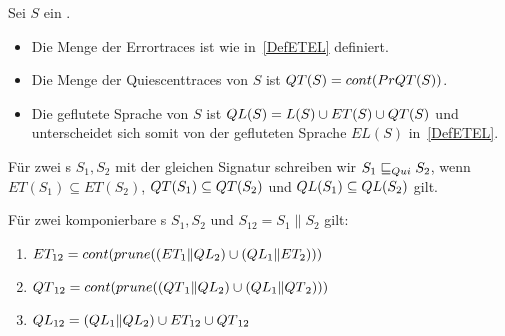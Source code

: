 \begin{Def}
  \label{DefQTQL}
  Sei $S$ ein \EIO{}.
  \begin{itemize}
    \item Die Menge der Errortraces ist wie in~\ref{DefETEL} definiert.
    \item Die Menge der Quiescenttraces von $S$ ist $QT{}(S) = cont(PrQT{}(S))$.
    \item Die geflutete Sprache von $S$ ist $QL{}(S)=L(S)\cup ET(S)\cup QT{}(S)$
      und unterscheidet sich somit von der gefluteten Sprache $EL(S)$
      in~\ref{DefETEL}.
  \end{itemize}
  Für zwei \EIO{}s $S_1, S_2$ mit der gleichen Signatur schreiben wir
  $S_1\sqsubseteq _{Qui} S_2$, wenn $ET(S_1)\subseteq ET(S_2)$,
  $QT{}(S_1)\subseteq QT{}(S_2)$ und $QL{}(S_1)\subseteq QL{}(S_2)$ gilt.
\end{Def}

\begin{satz}
  Für zwei komponierbare \EIO{}s $S_1, S_2$ und $S_{12} = S_1\|S_2$ gilt:
  \begin{enumerate}
    \item $ET_{12} = cont(prune((ET_1\|QL{}_2)\cup (QL{}_1\|ET_2)))$
    \item $QT{}_{12} = cont(prune((QT{}_1\|QL{}_2)\cup (QL{}_1\|QT{}_2)))$%
    \item $QL{}_{12} = (QL{}_1\|QL{}_2)\cup ET_{12}\cup QT{}_{12}$%
  \end{enumerate}
\end{satz}

